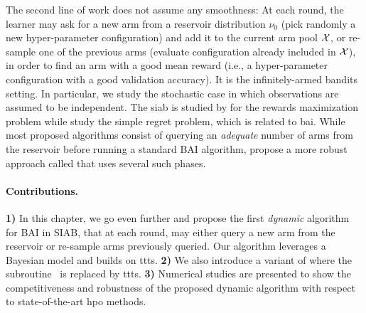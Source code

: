 The second line of work does not assume any smoothness: At each round, the learner may ask for a new arm from a \gls{reservoir} distribution $\nu_0$ (pick randomly a new hyper-parameter configuration) and add it to the current arm pool $\mathcal{X}$, or re-sample one of the previous arms (evaluate configuration already included in $\mathcal{X}$), in order to find an arm with a good mean reward (i.e., a hyper-parameter configuration with a good validation accuracy). It is the \gls{infinitely-armed bandits} setting. In particular, we study the stochastic case in which observations are assumed to be independent. The \gls{siab} is studied by \citet{berry1997infinite,wang2008ucbv} for the rewards maximization problem while \citet{carpentier2015siri,aziz2018confidence} study the simple regret problem, which is related to \gls{bai}. While most proposed algorithms consist of querying an \emph{adequate} number of arms from the reservoir before running a standard BAI algorithm, \cite{li2017hyperband} propose a more robust approach called \Hyperband{} that uses several such phases.

\paragraph{Contributions.}
\textbf{1)}
In this chapter, we go even further and propose the first \emph{dynamic} algorithm for BAI in SIAB, that at each round, may either query a new arm from the reservoir or re-sample arms previously queried. Our algorithm leverages a Bayesian model and builds on \gls{ttts}. 
\textbf{2)}
We also introduce a variant of \Hyperband{} where the \SHA subroutine~\citep{karnin2013sha} is replaced by \gls{ttts}. 
\textbf{3)}
Numerical studies are presented to show the competitiveness and robustness of the proposed dynamic algorithm with respect to state-of-the-art \gls{hpo} methods.
